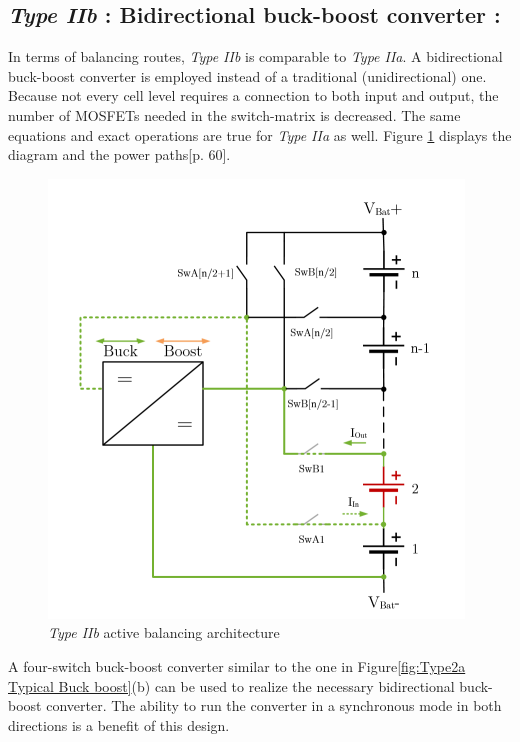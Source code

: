 \subsection{\textit{Type IIb} :  Bidirectional buck-boost converter :}
In terms of balancing routes, \textit{Type IIb} is comparable to \textit{Type IIa}. A bidirectional buck-boost converter is employed instead of a traditional (unidirectional) one. Because not every cell level requires a connection to both input and output, the number of MOSFETs needed in the switch-matrix is decreased. The same equations and exact operations are true for \textit{Type IIa} as well. Figure \ref{fig: Type2b active balancing architecture} displays the diagram and the power paths\cite{Active_Balancing_Thesis_Raber}[p. 60].
\begin{figure}[h]
	\centering
	\includegraphics[width=.6\textwidth]{Chap04/Figures/Type2abABMS.PNG}
	\caption{\textit{Type IIb} active balancing architecture }
	\label{fig: Type2b active balancing architecture}
\end{figure}
A four-switch buck-boost converter similar to the one in Figure\ref{fig:Type2a Typical Buck boost}(b) can be used to realize the necessary bidirectional buck-boost converter. The ability to run the converter in a synchronous mode in both directions is a benefit of this design.


